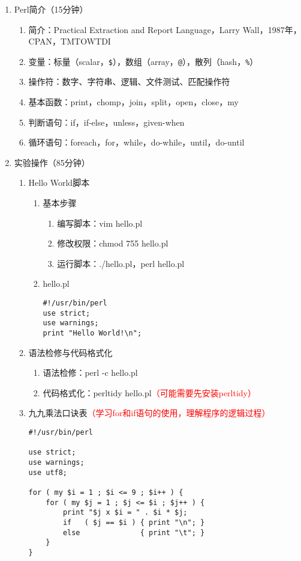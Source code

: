 \documentclass{TIJMUjiaoanSY}
\begin{document}
\firstTail

\newpage
\otherHeader

\begin{enumerate}
  \item Perl简介（15分钟）
    \begin{enumerate}
      \item 简介：Practical Extraction and Report Language，Larry Wall，1987年，CPAN，TMTOWTDI
      \item 变量：标量（scalar，\verb|$|），数组（array，\verb|@|），散列（hash，\verb|%|）
      \item 操作符：数字、字符串、逻辑、文件测试、匹配操作符
      \item 基本函数：print，chomp，join，split，open，close，my
      \item 判断语句：if，if-else，unless，given-when
      \item 循环语句：foreach，for，while，do-while，until，do-until
    \end{enumerate}
  \item 实验操作（85分钟）
    \begin{enumerate}
      \item Hello World脚本
\vspace*{-1em}
\begin{multicols}{2}
	\begin{enumerate}
	  \item 基本步骤
	    \begin{enumerate}
	      \item 编写脚本：vim hello.pl
	      \item 修改权限：chmod 755 hello.pl
	      \item 运行脚本：./hello.pl，perl hello.pl
	    \end{enumerate}
	  \item hello.pl
\begin{verbatim}
#!/usr/bin/perl
use strict;
use warnings;
print "Hello World!\n";
\end{verbatim}
	\end{enumerate}
\end{multicols}
\vspace*{-1em}
      \item 语法检修与代码格式化
	\begin{enumerate}
	  \item 语法检修：perl -c hello.pl
	  \item 代码格式化：perltidy hello.pl\textcolor{red}{（可能需要先安装perltidy）}
	\end{enumerate}
      \item 九九乘法口诀表\textcolor{red}{（学习for和if语句的使用，理解程序的逻辑过程）}
\begin{verbatim}
#!/usr/bin/perl 

use strict;
use warnings;
use utf8;

for ( my $i = 1 ; $i <= 9 ; $i++ ) {
    for ( my $j = 1 ; $j <= $i ; $j++ ) {
        print "$j x $i = " . $i * $j;
        if   ( $j == $i ) { print "\n"; }
        else              { print "\t"; }
    }
}
\end{verbatim}
    \end{enumerate}
\end{enumerate}

\otherTail
\end{document}

